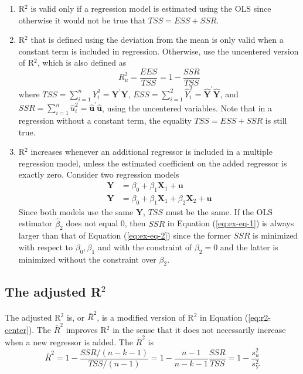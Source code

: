\documentclass[a4paper,11pt]{article}
\begin{document}
\begin{enumerate}
\item R\(^{\text{2}}\) is valid only if a regression model is estimated using the OLS
since otherwise it would not be true that \(TSS = ESS + SSR\).
\item R\(^{\text{2}}\) that is defined using the deviation from the mean is only valid
when a constant term is included in regression. Otherwise, use the
uncentered version of R\(^{\text{2}}\), which is also defined as
\begin{equation}
\label{eq:r2-uncenter}
R^2_u = \frac{EES}{TSS} = 1 - \frac{SSR}{TSS}
\end{equation}
where \(TSS = \sum_{i=1}^n Y_i^2 = \mathbf{Y}^{\prime} \mathbf{Y}\),
\(ESS = \sum_{i=1}^2 \hat{Y}_i^2 = \hat{\mathbf{Y}}^{\prime}
   \hat{\mathbf{Y}}\), and \(SSR = \sum_{i=1}^n \hat{u}_i^2 =
   \hat{\mathbf{u}}^{\prime} \hat{\mathbf{u}}\), using the uncentered
variables.  Note that in a regression without a constant term, the
equality \(TSS = ESS + SSR\) is still true.
\item R\(^{\text{2}}\) increases whenever an additional regressor is included in a
multiple regression model, unless the estimated coefficient on the
added regressor is exactly zero. Consider two regression models
\begin{align}
\mathbf{Y} &= \beta_0 + \beta_1 \mathbf{X}_1 + \mathbf{u}
\label{eq:ex-eq-1} \\
\mathbf{Y} &= \beta_0 + \beta_1 \mathbf{X}_1 + \beta_2 \mathbf{X}_2 + \mathbf{u} \label{eq:ex-eq-2}
\end{align}
Since both models use the same \(\mathbf{Y}\), \(TSS\) must be the
same. If the OLS estimator \(\hat{\beta}_2\) does not equal 0, then
\(SSR\) in Equation (\ref{eq:ex-eq-1}) is always larger than that of
Equation (\ref{eq:ex-eq-2})  since the former \(SSR\) is minimized
with respect to \(\beta_0, \beta_1\) and with the constraint of
\(\beta_2 = 0\) and the latter is minimized without the constraint
over \(\beta_2\).
\end{enumerate}

\subsection{The adjusted R\(^{\text{2}}\)}
\label{sec:orgcd4bf18}
The adjusted R\(^{\text{2}}\) is, or \(\bar{R}^2\), is a modified version of
R\(^{\text{2}}\) in Equation (\ref{eq:r2-center}). The \(\bar{R}^2\) improves R\(^{\text{2}}\) in the sense that it does not
necessarily increase when a new regressor is added. The \(\bar{R}^2\) is
\begin{equation}
\label{eq:adj-r2}
\bar{R}^2 = 1 - \frac{SSR / (n-k-1)}{TSS / (n-1)} = 1 - \frac{n-1}{n-k-1}\frac{SSR}{TSS} = 1 - \frac{s^2_u}{s^2_Y}
\end{equation}
\end{document}
